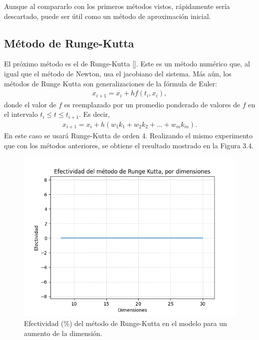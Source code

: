 \par Aunque al compararlo con los primeros m\'etodos vistos, r\'apidamente ser\'ia descartado, puede ser \'util como un m\'etodo de aproximaci\'on inicial.

\subsection{M\'etodo de Runge-Kutta}

\par El pr\'oximo m\'etodo es el de Runge-Kutta [\cite{23}]. Este es un m\'etodo num\'erico que, al igual que el m\'etodo de Newton, usa el jacobiano del sistema. M\'as a\'un, 
los m\'etodos de Runge Kutta son generalizaciones de la f\'ormula de Euler:
\begin{eqnarray}
x_{i+1}=x_{i}+hf(t_i,x_i),\nonumber
\end{eqnarray}
donde el valor de $f$ es reemplazado por un promedio ponderado de valores de $f$ en el intervalo $t_i\leq t \leq t_{i+1}$. Es decir,
\begin{eqnarray}
x_{i+1}=x_i+h(w_1k_1+w_2k_2+...+w_mk_m).\nonumber
\end{eqnarray}
En este caso se usar\'a Runge-Kutta de orden 4. Realizando el mismo experimento que con los m\'etodos anteriores, se obtiene el resultado mostrado en la Figura 3.4.\\

\begin{figure}[h]
\center
\includegraphics[scale=.4]{Graphics/RungeKutta.png}
\caption{Efectividad (\%) del m\'etodo de Runge-Kutta en el modelo para un aumento de la dimensi\'on.}
\end{figure}

